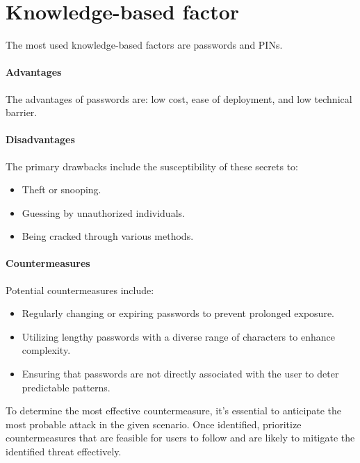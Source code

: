 \section{Knowledge-based factor}

The most used knowledge-based factors are passwords and PINs. 

\paragraph*{Advantages}
The advantages of passwords are: low cost, ease of deployment, and low technical barrier. 

\paragraph*{Disadvantages}
The primary drawbacks include the susceptibility of these secrets to:
\begin{itemize}
    \item Theft or snooping.
    \item Guessing by unauthorized individuals.
    \item Being cracked through various methods.
\end{itemize}

\paragraph*{Countermeasures}
Potential countermeasures include:
\begin{itemize}
    \item Regularly changing or expiring passwords to prevent prolonged exposure.
    \item Utilizing lengthy passwords with a diverse range of characters to enhance complexity.
    \item Ensuring that passwords are not directly associated with the user to deter predictable patterns.
\end{itemize}
To determine the most effective countermeasure, it's essential to anticipate the most probable attack in the given scenario.
Once identified, prioritize countermeasures that are feasible for users to follow and are likely to mitigate the identified threat effectively.

